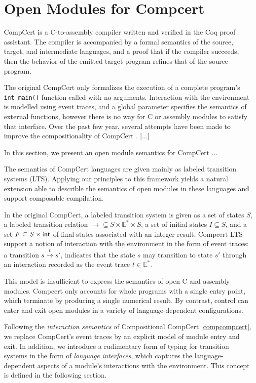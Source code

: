 \section{Open Modules for Compcert}

CompCert is a C-to-assembly compiler written and verified
in the Coq proof assistant.
The compiler is accompanied by
a formal semantics of the source, target, and intermediate languages,
and a proof that if the compiler succeeds,
then the behavior of the emitted target program
refines that of the source program.

The original CompCert
only formalizes the execution of a complete program's
\texttt{int main()} function called with no arguments.
Interaction with the environment is modelled using event traces,
and a global parameter specifies the semantics of external functions,
however there is no way for C or assembly modules to
satisfy that interface.
Over the past few year,
several attempts have been made to improve the compositionality of CompCert
\cite{compcompcert,popl15,sepcompcert,cpp15}.
[...]

In this section,
we present an open module semantics for CompCert
...

The semantics of CompCert languages are given mainly
as labeled transition systems (LTS).
Applying our principles to this framework
yields a natural extension
able to describle the semantics of
open modules in these languages
and support composable compilation.

In the original CompCert,
a labeled transition system is given as
a set of states $S$,
a labeled transition relation
${\rightarrow} \subseteq S \times \mathbb{E}^* \times S$,
a set of initial states
$I \subseteq S$,
and a set
$F \subseteq S \times  \textsf{int} $
of final states associated with an integer result.
Compcert LTS support a notion of interaction with the environment
in the form of event traces:
a transition $s \stackrel{t}{\rightarrow} s'$,
indicates that the state $s$ may transition to state $s'$
through an interaction recorded as the event trace $t \in \mathbb{E}^*$.

This model is insufficient to express
the semantics of open C and assembly modules.
Compcert only accounts for
whole programs with a single entry point,
which terminate by producing a single numerical result.
By contrast,
control can enter and exit open modules
in a variety of language-dependent configurations.

Following the \emph{interaction semantics} of
Compositional CompCert \ref{compcompcert},
we replace CompCert's event traces
by an explicit model of module entry and exit.
In addition,
we introduce a rudimentary form of typing
for transition systems
in the form of \emph{language interfaces},
which captures the language-dependent aspects
of a module's interactions with the environment.
This concept is defined in the following section.

